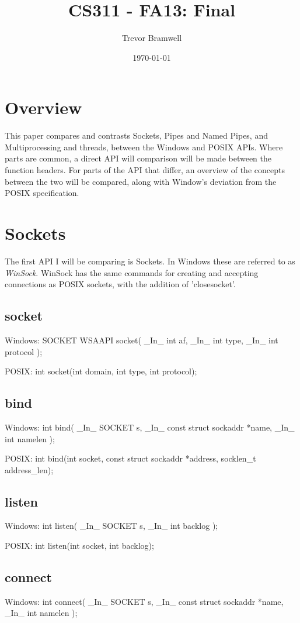 \documentclass[letterpaper,10pt]{article}
\title{CS311 - FA13: Final}
\date{\today}
\author{Trevor Bramwell}
\begin{document}
\maketitle

\section{Overview}

This paper compares and contrasts Sockets, Pipes and Named Pipes, and
Multiprocessing and threads, between the Windows and POSIX APIs. Where
parts are common, a direct API will comparison will be made between the
function headers. For parts of the API that differ, an overview of the
concepts between the two will be compared, along with Window's
deviation from the POSIX specification.

\section{Sockets}

The first API I will be comparing is Sockets. In Windows these are
referred to as \emph{WinSock}. WinSock has the same commands for
creating and accepting connections as POSIX sockets, with the addition
of 'closesocket'.

\subsection{socket}
Windows:
SOCKET WSAAPI socket(
  \_In\_  int af,
  \_In\_  int type,
  \_In\_  int protocol
);

POSIX:
int socket(int domain, int type, int protocol);

\subsection{bind}
Windows:
int bind(
  \_In\_  SOCKET s,
  \_In\_  const struct sockaddr *name,
  \_In\_  int namelen
);

POSIX:
int bind(int socket, const struct sockaddr *address,
       socklen\_t address\_len);

\subsection{listen}
Windows:
int listen(
  \_In\_  SOCKET s,
  \_In\_  int backlog
);

POSIX:
int listen(int socket, int backlog);

\subsection{connect}
Windows:
int connect(
  \_In\_  SOCKET s,
  \_In\_  const struct sockaddr *name,
  \_In\_  int namelen
);
\end{document}
